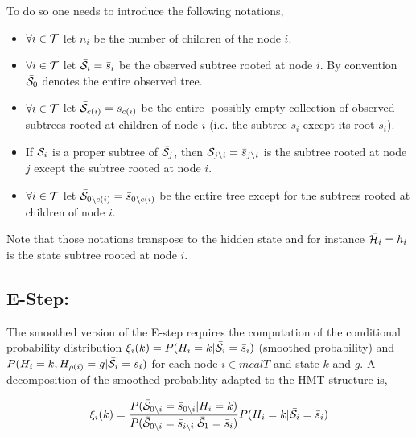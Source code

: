 \documentclass[a4paper,11pt]{report}
\begin{document}
{    To do so one needs to introduce the following notations,
    \begin{itemize}
			\item $\forall i \in \mathcal{T}$ let $n_{i}$ be the number of children of the node $i$.
      \item $\forall i \in \mathcal{T}$ let $\bar{\mathcal{S}}_{i}= \bar{s}_{i}$ be the observed subtree rooted at node $i$. By convention $\bar{\mathcal{S}}_{0}$ denotes the entire observed tree.
      \item $\forall i \in \mathcal{T}$ let $\bar{\mathcal{S}}_{c(i)}= \bar{s}_{c(i)}$ be the entire -possibly empty collection of observed subtrees rooted at children of node $i$ (i.e. the subtree $\bar{s}_{i}$ except its root $s_{i}$).
      \item If $\bar{\mathcal{S}}_{i}$ is a proper subtree of $\bar{\mathcal{S}}_{j}$, then $\bar{\mathcal{S}}_{j\backslash i} = \bar{s}_{j\backslash i}$ is the subtree rooted at node $j$ except the subtree rooted at node $i$.
      \item $\forall i \in \mathcal{T}$ let $\bar{\mathcal{S}}_{0\backslash c(i)}= \bar{s}_{0\backslash c(i)}$ be the entire tree except for the subtrees rooted at children of node $i$.
    \end{itemize}
    Note that those notations transpose to the hidden state and for instance $\bar{\mathcal{H}}_{i}= \bar{h}_{i}$ is the state subtree rooted at node $i$.\\
    
    \subsection{E-Step:}
			\label{subsec:SHMT/Learning/E}
			The smoothed version of the E-step requires the computation of the conditional probability distribution $\xi_{i}(k) = P(H_{i}=k | \bar{\mathcal{S}}_{i}= \bar{s}_{i})$ (smoothed probability) and $P(H_{i}=k, H_{\rho(i)}=g | \bar{\mathcal{S}}_{i}= \bar{s}_{i})$ for each node $i \in mcalT$ and state $k$ and $g$. A decomposition of the smoothed probability adapted to the HMT structure is,
			
			\begin{equation}
			  \xi_{i}(k) = 
					\frac{P(\bar{\mathcal{S}}_{0\backslash i}= \bar{s}_{0\backslash i} | H_{i}=k)}
						{P(\bar{\mathcal{S}}_{0\backslash i}= \bar{s}_{i\backslash i} | \bar{\mathcal{S}}_{1}= \bar{s}_{i})} 
					P(H_{i}= k |\bar{\mathcal{S}}_{i}= \bar{s}_{i})
				\label{eq:Smoothed P decomposition}
			\end{equation}
			
}
\end{document}
